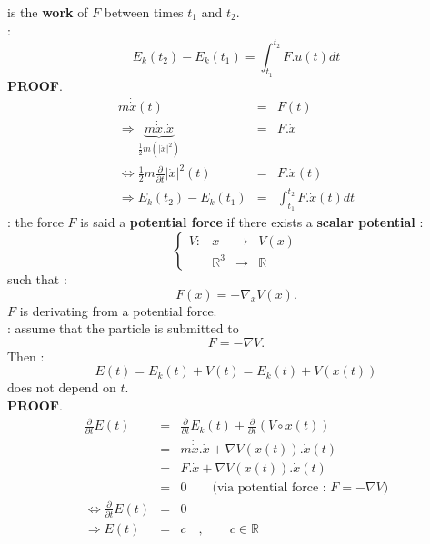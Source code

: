 \documentclass{report}
\newcommand*{\definition}[1]{\noindent\textbf{\color{cadmiumgreen}{#1}}}
\newcommand*{\theorem}[1]{\noindent\textbf{\color{purple}{#1}}}
\theoremstyle{plain}
\theoremstyle{definition}
\theoremstyle{remark}
\begin{document}
is the \textbf{work} of $F$ between times $t_1$ and $t_2$. \\
\theorem{Theorem} : 
\begin{equation}
E_k(t_2) - E_k(t_1) = \int_{t_1}^{t_2}F.u(t) dt
\end{equation}
\textbf{PROOF}.
\begin{eqnarray*}
m\dot{\dot{x}}(t) &=& F(t) \\
\Rightarrow \underbrace{m\dot{\dot{x}}.\dot{x}}_{\frac{1}{2}m\left(\vert \dot{x}\vert^2 \right)} &=& F.\dot{x} \\
\Leftrightarrow \frac{1}{2}m \frac{\partial}{\partial t}\vert \dot{x} \vert^2(t) &=& F.\dot{x}(t) \\
\Rightarrow E_k(t_2) - E_k(t_1) &=& \int_{t_1}^{t_2}F.\dot{x}(t)dt
\end{eqnarray*}
\definition{Potential force} : the force $F$ is said a \textbf{potential force} if there exists a \textbf{scalar potential} :
\begin{equation}
	\left\lbrace
	\begin{array}{lclc}
        V : & x & \rightarrow & V(x)\\
 & \mathbb{R}^3 & \rightarrow & \mathbb{R}
    \end{array}
    \right.
\end{equation}
such that :
\begin{equation}
F(x) = -\nabla_xV(x).
\end{equation}
$F$ is derivating from a potential force. \\
\theorem{Theorem} : assume that the particle is submitted to \begin{equation}
F = -\nabla V.
\label{potential_force}
\end{equation}
Then :
\begin{equation}
E(t) = E_k(t) + V(t) = E_k(t) + V(x(t))
\end{equation}
does not depend on $t$.\\
\textbf{PROOF}.
\begin{eqnarray*}
\frac{\partial}{\partial t}E(t) &=& \frac{\partial}{\partial t}E_k(t) + \frac{\partial}{\partial t}(V \circ x(t)) \\
&=& m\dot{\dot{x}}.\dot{x} + \nabla V(x(t)).\dot{x}(t) \\
&=& F.\dot{x} + \nabla V(x(t)).\dot{x}(t) \\
&=& 0 \qquad \text{(via potential force : $F = -\nabla V$)}\\
\Leftrightarrow \frac{\partial}{\partial t}E(t) &=& 0 \\
\Rightarrow E(t) &=& c \quad, \qquad c \in \mathbb{R}
\end{eqnarray*}
\end{document}
